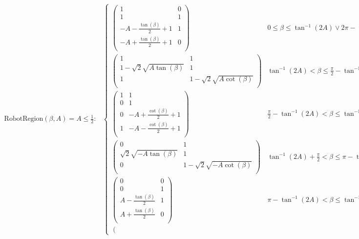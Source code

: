 \begin{table*}
\tiny
\begin{align}
\text{RobotRegion}(\beta,A)= \nonumber 
A\leq \frac{1}{2}:&
\begin{cases}
 \left(
\begin{array}{cc}
 1 & 0 \\
 1 & 1 \\
 -A-\frac{\tan (\beta )}{2}+1 & 1 \\
 -A+\frac{\tan (\beta )}{2}+1 & 0 \\
\end{array}
\right) & 0\leq \beta \leq \tan ^{-1}(2 A)\lor 2 \pi -\tan ^{-1}(2 A)<\beta \leq 2 \pi  \\
 \left(
\begin{array}{cc}
 1 & 1 \\
 1-\sqrt{2} \sqrt{A \tan (\beta )} & 1 \\
 1 & 1-\sqrt{2} \sqrt{A \cot (\beta )} \\
\end{array}
\right) & \tan ^{-1}(2 A)<\beta \leq \frac{\pi }{2}-\tan ^{-1}(2 A) \\
 \left(
\begin{array}{cc}
 1 & 1 \\
 0 & 1 \\
 0 & -A+\frac{\cot (\beta )}{2}+1 \\
 1 & -A-\frac{\cot (\beta )}{2}+1 \\
\end{array}
\right) & \frac{\pi }{2}-\tan ^{-1}(2 A)<\beta \leq \tan ^{-1}(2 A)+\frac{\pi }{2} \\
 \left(
\begin{array}{cc}
 0 & 1 \\
 \sqrt{2} \sqrt{-A \tan (\beta )} & 1 \\
 0 & 1-\sqrt{2} \sqrt{-A \cot (\beta )} \\
\end{array}
\right) & \tan ^{-1}(2 A)+\frac{\pi }{2}<\beta \leq \pi -\tan ^{-1}(2 A) \\
 \left(
\begin{array}{cc}
 0 & 0 \\
 0 & 1 \\
 A-\frac{\tan (\beta )}{2} & 1 \\
 A+\frac{\tan (\beta )}{2} & 0 \\
\end{array}
\right) & \pi -\tan ^{-1}(2 A)<\beta \leq \tan ^{-1}(2 A)+\pi  \\
 \left(

\end{cases}
\end{align}
\end{table*}
